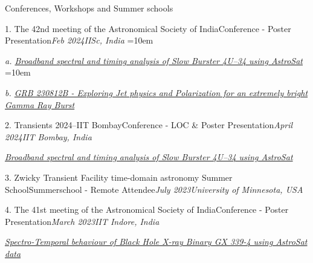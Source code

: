 \begin{section}{Conferences, Workshops and Summer schools}

    \begin{subsectionnobullet1}{1. The 42nd meeting of the Astronomical Society of India}{Conference - Poster Presentation}{\textit{Feb 2024}}{\textit{IISc, India}}
        \vspace{-1em}
                \hangindent=10em \item\textit{a. \href{https://www.dropbox.com/scl/fi/aw33s2tmk6wsrwwbju25e/ASI-2024-poster.pdf?rlkey=aiasm86d2e3t40235q0knu635&st=3qr65pz8&dl=0}{Broadband spectral and timing analysis of Slow Burster 4U--34 using AstroSat}}
                \vspace{-0.5em}
                \hangindent=10em \item\textit{b. \href{https://www.dropbox.com/scl/fi/070gc2spxxeulyyuaau4u/GRB-230812B-ASI-Poster.pdf?rlkey=6mxxyuahft6bxbib6txfyoto4&st=k1wjpe8d&dl=0}{GRB 230812B - Exploring Jet physics and Polarization for an extremely bright Gamma Ray Burst}}
        \end{subsectionnobullet1}

    \vspace{-0.5em}

    \begin{subsectionnobullet1}{2. Transients 2024--IIT Bombay}{Conference - LOC \& Poster Presentation}{\textit{April 2024}}{\textit{IIT Bombay, India}}
    \vspace{-1em}
    \item\textit{\href{https://www.dropbox.com/scl/fi/aw33s2tmk6wsrwwbju25e/ASI-2024-poster.pdf?rlkey=aiasm86d2e3t40235q0knu635&st=3qr65pz8&dl=0}{Broadband spectral and timing analysis of Slow Burster 4U--34 using AstroSat}}
    \end{subsectionnobullet1}

     \vspace{-0.5em}

    \begin{subsectionnobullet1}{3. Zwicky Transient Facility time-domain astronomy Summer School}{Summerschool - Remote Attendee}{\textit{July 2023}}{\textit{University of Minnesota, USA}}
    \end{subsectionnobullet1}

     \vspace{-0.5em}

    \begin{subsectionnobullet1}{4. The 41st meeting of the Astronomical Society of India}{Conference - Poster Presentation}{\textit{March 2023}}{\textit{IIT Indore, India}}
    \vspace{-1em}
    \item\textit{\href{https://www.dropbox.com/scl/fi/2vxerkx3lhnbb6bgwactw/ASI-2023-Poster.pdf?rlkey=1hyjudte4bn1xf4sks47nb0c5&st=lc2jnnm0&dl=0}{Spectro-Temporal behaviour of Black Hole X-ray Binary GX 339-4 using AstroSat data}}
    \end{subsectionnobullet1}


\end{section}
